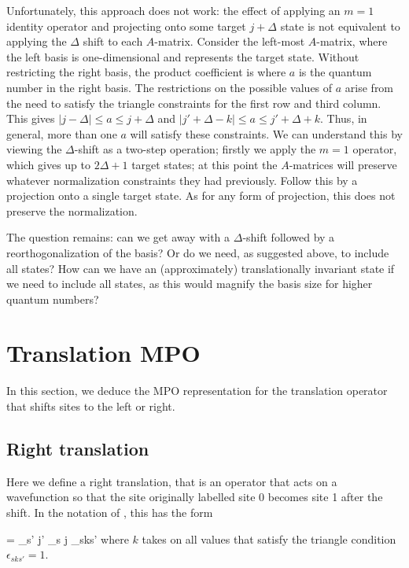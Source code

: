 \documentclass{article}[10pt]
\begin{document}
Unfortunately, this approach does not work: the effect of applying an $m=1$ identity operator
and projecting onto some target $j+\Delta$ state is not equivalent to applying the $\Delta$ shift
to each $A$-matrix. Consider the left-most $A$-matrix, where the left basis is one-dimensional
and represents the target state. Without restricting the right basis, the product coefficient is
\beq
{}
\eeq
where $a$ is the quantum number in the right basis. The restrictions on the possible values
of $a$ arise from the need to satisfy the triangle constraints for the first row and third column.
This gives $|j-\Delta| \leq a \leq j+\Delta$ and $|j'+\Delta-k| \leq a \leq j'+\Delta+k$.
Thus, in general, more than one $a$ will satisfy these constraints. We can understand this by
viewing the $\Delta$-shift as a two-step operation; firstly we apply the $m=1$ operator, which gives
up to $2\Delta+1$ target states; at this point the $A$-matrices will preserve whatever normalization
constraints they had previously. Follow this by a projection onto a single target state. As for any
form of projection, this does not preserve the normalization.

The question remains: can we get away with a $\Delta$-shift followed by a reorthogonalization of
the basis? Or do we need, as suggested above, to include all states? How can we have an (approximately)
translationally invariant state if we need to include all states, as this would magnify the basis
size for higher quantum numbers?

\section{Translation MPO}

In this section, we deduce the MPO representation for the translation operator
that shifts sites to the left or right. 

\subsection{Right translation}

Here we define a
right translation, that is an operator that acts on a wavefunction so that
the site originally labelled site 0 becomes site 1 after the shift.
In the notation of , this has the form

\beq
{} = \delta_{s' j'} \delta_{s j} \epsilon_{sks'}
\eeq
where $k$ takes on all values that satisfy the triangle condition
$\epsilon_{sks'}=1$.
\end{document}
